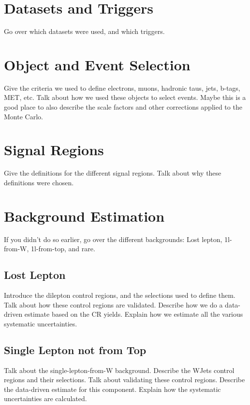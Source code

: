 \section{Datasets and Triggers}
\label{sec:stopdatatrig}

Go over which datasets were used, and which triggers.

\section{Object and Event Selection}
\label{sec:stopselections}

Give the criteria we used to define electrons, muons, hadronic taus,
jets, b-tags, MET, etc.
Talk about how we used these objects to select events.
Maybe this is a good place to also describe the scale factors and
other corrections applied to the Monte Carlo.

\section{Signal Regions}
\label{sec:stopsigregs}

Give the definitions for the different signal regions.
Talk about why these definitions were chosen.

\section{Background Estimation}
\label{sec:stopbkgest}

If you didn't do so earlier, go over the different backgrounds:
Lost lepton, 1l-from-W, 1l-from-top, and rare.

\subsection{Lost Lepton}
\label{ssec:stoplostlep}

Introduce the dilepton control regions, and the selections used
to define them.
Talk about how these control regions are validated.
Describe how we do a data-driven estimate based on the CR yields.
Explain how we estimate all the various systematic uncertainties.

\subsection{Single Lepton not from Top}
\label{ssec:stop1lw}

Talk about the single-lepton-from-W background.
Describe the WJets control regions and their selections.
Talk about validating these control regions.
Describe the data-driven estimate for this component.
Explain how the systematic uncertainties are calculated.

